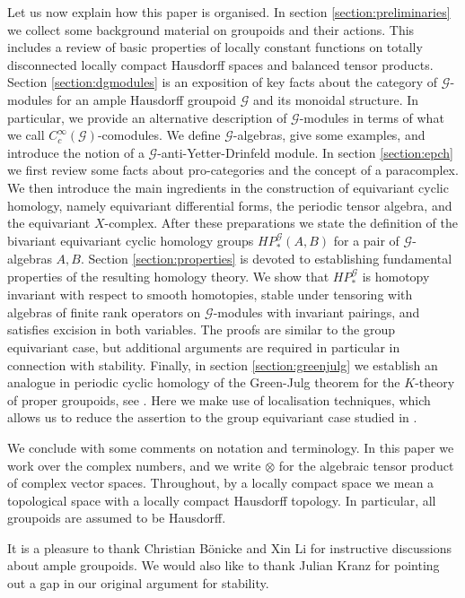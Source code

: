 \documentclass{amsart}
\newcommand{\G}{\mathcal{G}}
\newcommand{\ccinfty}{C_c^\infty}
\begin{document}
Let us now explain how this paper is organised. In section \ref{section:preliminaries} we collect some background material on groupoids and their actions. This includes a review of basic properties of locally constant functions on totally disconnected locally compact Hausdorff spaces and balanced tensor products. Section \ref{section:dgmodules} is an exposition of key facts about the category of $ \G $-modules for an ample Hausdorff groupoid $ \G $ and its monoidal structure. In particular, we provide an alternative description of $ \G $-modules in terms of what we call $ \ccinfty(\G) $-comodules. We define $ \G $-algebras, give some examples, and introduce the notion of a $ \G $-anti-Yetter-Drinfeld module. 
In section \ref{section:epch} we first review some facts about pro-categories and the concept of a paracomplex. We then introduce the main ingredients in the construction of equivariant cyclic homology, namely equivariant differential forms, the periodic tensor algebra, and the equivariant $ X $-complex. After these preparations we state the  definition of the bivariant equivariant cyclic homology groups $ HP^\G_*(A,B) $ for a pair of $ \G $-algebras $ A,B $. Section \ref{section:properties} is devoted to establishing fundamental properties of the resulting homology theory. We show that $ HP^\G_* $ is homotopy invariant with respect to smooth homotopies, stable under tensoring with algebras of finite rank operators on $ \G $-modules with invariant pairings, and satisfies excision in both variables. The proofs are similar to the group equivariant case, but additional arguments are required in particular in connection with stability. Finally, in section \ref{section:greenjulg} we establish an analogue in periodic cyclic homology of the Green-Julg theorem for the $ K $-theory of proper groupoids, see \cite{TU_novikovhyperbolique}. Here we make use of localisation techniques, which allows us to reduce the assertion to the group equivariant case studied in \cite{VOIGT_thesis}. 

We conclude with some comments on notation and terminology. In this paper we work over the complex numbers, and we write $ \otimes $ for the algebraic tensor product of complex vector spaces. Throughout, by a locally compact space we mean a topological space with a locally compact Hausdorff topology. In particular, all groupoids are assumed to be Hausdorff. 

It is a pleasure to thank Christian B\"onicke and Xin Li for instructive discussions about ample groupoids. We would also like to thank Julian Kranz for pointing out a gap in our original argument for stability. 
\end{document}
